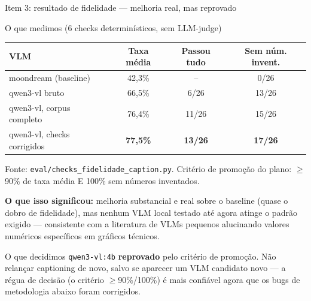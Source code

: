 \documentclass{beamer}
\newenvironment{numerobloco}[1]{\begin{block}{#1}}{\end{block}}
\newenvironment{decisaobloco}[1]{\begin{alertblock}{#1}}{\end{alertblock}}
\begin{document}
\begin{frame}{Item 3: resultado de fidelidade — melhoria real, mas reprovado}
  \small
  \begin{numerobloco}{O que medimos (6 checks determinísticos, sem LLM-judge)}
    \begin{center}
    \footnotesize
    \begin{tabular}{lccc}
      \toprule
      \textbf{VLM} & \textbf{Taxa média} & \textbf{Passou tudo} & \textbf{Sem núm. invent.} \\
      \midrule
      moondream (baseline)         & 42,3\%          & --    & 0/26 \\
      qwen3-vl bruto               & 66,5\%          & 6/26  & 13/26 \\
      qwen3-vl, corpus completo    & 76,4\%          & 11/26 & 15/26 \\
      qwen3-vl, checks corrigidos  & \textbf{77,5\%} & \textbf{13/26} & \textbf{17/26} \\
      \bottomrule
    \end{tabular}
    \end{center}
    \footnotesize Fonte: \texttt{eval/checks\_fidelidade\_caption.py}. Critério de
    promoção do plano: $\geq$90\% de taxa média E 100\% sem números inventados.
  \end{numerobloco}

  \pause
  \textbf{O que isso significou:} melhoria substancial e real sobre o baseline
  (quase o dobro de fidelidade), mas nenhum VLM local testado até agora atinge o
  padrão exigido — consistente com a literatura de VLMs pequenos alucinando valores
  numéricos específicos em gráficos técnicos.

  \pause
  \begin{decisaobloco}{O que decidimos}
    \texttt{qwen3-vl:4b} \textbf{reprovado} pelo critério de promoção. Não relançar
    captioning de novo, salvo se aparecer um VLM candidato novo — a régua de decisão
    (o critério $\geq$90\%/100\%) é mais confiável agora que os bugs de metodologia
    abaixo foram corrigidos.
  \end{decisaobloco}
\end{frame}
\end{document}
